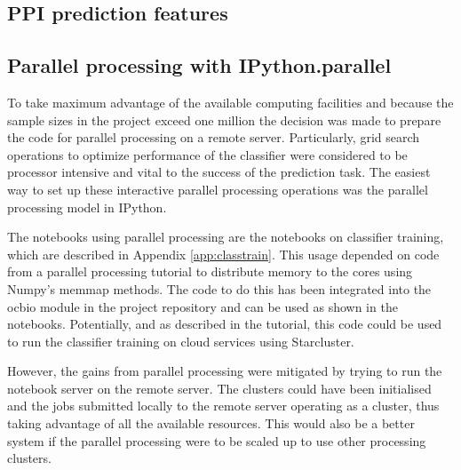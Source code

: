 \begin{itemize}
\lipsum[21-25]





\subsection{PPI prediction features}




\subsection{Parallel processing with IPython.parallel}

To take maximum advantage of the available computing facilities and because the sample sizes in the project exceed one million the decision was made to prepare the code for parallel processing on a remote server.
Particularly, grid search operations to optimize performance of the classifier were considered to be processor intensive and vital to the success of the prediction task.
The easiest way to set up these interactive parallel processing operations was the parallel processing model in IPython\cite{parallel_python_webpage}.

The notebooks using parallel processing are the notebooks on classifier training, which are described in Appendix \ref{app:classtrain}.
This usage depended on code from a parallel processing tutorial\cite{ogrisel_parallel} to distribute memory to the cores using Numpy's memmap methods.
The code to do this has been integrated into the ocbio module in the project repository and can be used as shown in the notebooks.
Potentially, and as described in the tutorial, this code could be used to run the classifier training on cloud services using Starcluster.

However, the gains from parallel processing were mitigated by trying to run the notebook server on the remote server.
The clusters could have been initialised and the jobs submitted locally to the remote server operating as a cluster, thus taking advantage of all the available resources.
This would also be a better system if the parallel processing were to be scaled up to use other processing clusters.


\end{itemize}
